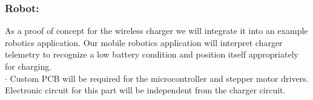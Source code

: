 \documentclass[12pt]{article}
\begin{document}

\subsubsection{Robot:}
As a proof of concept for the wireless charger we will integrate it into an example robotics application. Our mobile robotics application will interpret charger telemetry to recognize a low battery condition and position itself appropriately for charging. \\
$\cdot$ Custom PCB will be required for the microcontroller and stepper motor drivers. Electronic circuit for this part will be independent from the charger circuit.
\end{document}
